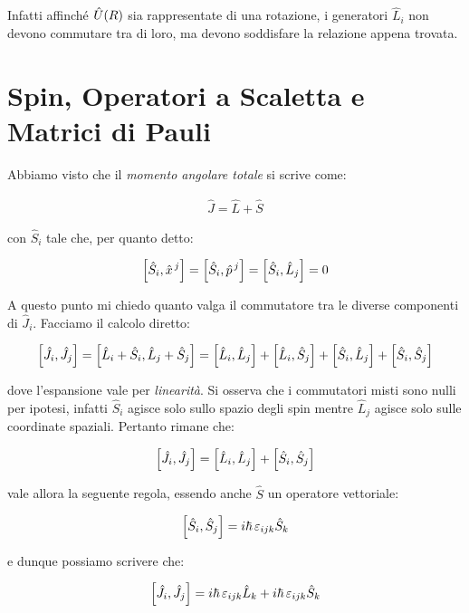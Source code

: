 	Infatti affinché $\hat{U}\qty(R)$ sia rappresentate di una rotazione, i generatori $\hat{L}_i$ non devono commutare tra di loro, ma devono soddisfare la relazione appena trovata.

\section{Spin, Operatori a Scaletta e Matrici di Pauli}

	Abbiamo visto che il \textit{momento angolare totale} si scrive come:

\begin{align*}
	\hat{J} = \hat{L} + \hat{S}
\end{align*}
	
	con $\hat{S}_i$ tale che, per quanto detto:
	
\begin{align*}
	\qty[\hat{S}_i, \hat{x}^{\, j}] = \qty[\hat{S}_i, \hat{p}^{\, j}] = \qty[\hat{S}_i, \hat{L}_{ j}] = 0 
\end{align*}

	A questo punto mi chiedo quanto valga il commutatore tra le diverse componenti di $\hat{J}_i$. Facciamo il calcolo diretto:

\begin{align*}
	\qty[\hat{J}_i, \hat{J}_j] = \qty[\hat{L}_i + \hat{S}_i, \hat{L}_j + \hat{S}_j ] = \qty[\hat{L}_i, \hat{L}_j] + \qty[\hat{L}_i, \hat{S}_j] +\qty[\hat{S}_i, \hat{L}_j] + \qty[\hat{S}_i, \hat{S}_j] 
\end{align*}
	
	dove l'espansione vale per \textit{linearità}. Si osserva che i commutatori misti sono nulli per ipotesi, infatti $\hat{S}_i$ agisce solo sullo spazio degli spin mentre $\hat{L}_j$ agisce solo sulle coordinate spaziali. Pertanto rimane che:
	
\begin{align*}
	\qty[\hat{J}_i, \hat{J}_j] =  \qty[\hat{L}_i, \hat{L}_j] + \qty[\hat{S}_i, \hat{S}_j] 
\end{align*}

	vale allora la seguente regola, essendo anche $\hat{S}$ un operatore vettoriale:

\begin{align*}
	\qty[\hat{S}_i, \hat{S}_j] =  i \hbar \, \varepsilon_{ijk} \hat{S}_k
\end{align*}

	e dunque possiamo scrivere che:
 
\begin{align*}
	\qty[\hat{J}_i, \hat{J}_j]  =  i \hbar \, \varepsilon_{ijk} \hat{L}_k + i \hbar \, \varepsilon_{ijk} \hat{S}_k
\end{align*}

